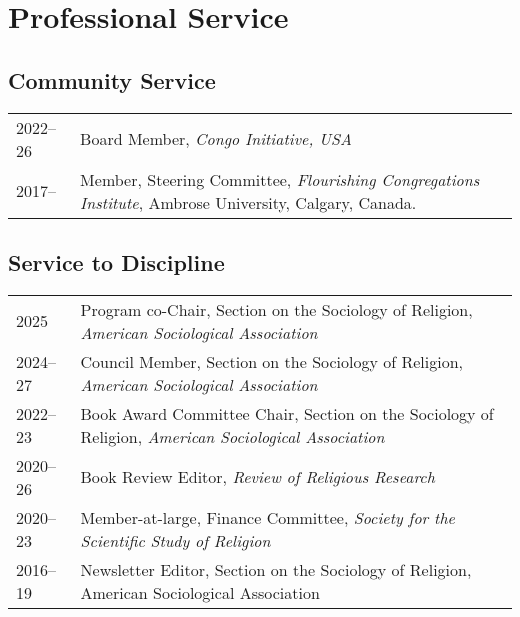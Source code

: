\section*{Professional Service}
\newcommand{\tabitem}{~~\llap{\textbullet}~~}
\subsection*{Community Service}
\begin{tabular}{p{} p{}}
2022--26 & Board Member, \textit{Congo Initiative, USA}\\
2017-- & Member, Steering Committee, \textit{Flourishing Congregations Institute}, Ambrose University, Calgary, Canada.\\
\end{tabular}

\subsection*{Service to Discipline}

\begin{tabular}{p{} p{}}
2025 & Program co-Chair, Section on the Sociology of Religion, \textit{American Sociological Association}\\
2024--27 & Council Member, Section on the Sociology of Religion, \textit{American Sociological Association}\\
2022--23 & Book Award Committee Chair, Section on the Sociology of Religion, \textit{American Sociological Association}\\
2020--26 & Book Review Editor, \textit{Review of Religious Research}\\
2020--23 & Member-at-large, Finance Committee, \textit{Society for the Scientific Study of Religion}\\
2016--19 & Newsletter Editor, Section on the Sociology of Religion, American Sociological Association\\
\end{tabular}


